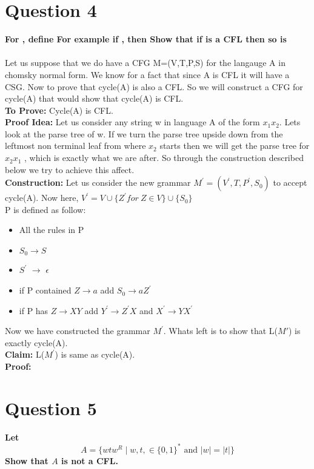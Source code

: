 \documentclass{article}
\begin{document}
\section{Question 4}
\textbf{For , define 
For example if , then 
Show that if  is a CFL then so is } \\
\\
Let us suppose that we do have a CFG M=(V,T,P,S) for the langauge A in chomsky normal form. We know for a fact that since A is CFL it will have a CSG. Now to prove that cycle(A) is also a CFL. So we will construct a CFG for cycle(A) that would show that cycle(A) is CFL. \\
\textbf{To Prove:} Cycle(A) is CFL.\\
\textbf{Proof Idea:} Let us consider any string w in language A of the form $x_1 x_2$. Lets look at the parse tree of w. If we turn the parse tree upside down from the leftmost non terminal leaf from where $x_2$ starts then we will get the parse tree for $x_2 x_1$ , which is exactly what we are after. So through the construction described below we try to achieve this affect.\\
\textbf{Construction:} Let us consider the new grammar $M^{'} = (V^{'},T,P^{'},S_0)$ to accept cycle(A). Now here, $ V^{'} = V \cup \{ Z^{'} for \ Z \in V \} \cup \{ S_0\}$\\ P is defined as follow: 
\begin{itemize}
    \item All the rules in P
    \item $S_0 \rightarrow S$
    \item $S^{'}$ $\rightarrow$ $\epsilon$
    \item if  P  contained $ Z \rightarrow a$ add $S_0 \rightarrow aZ^{'}$
    \item if P has $Z \rightarrow XY$ add $Y^{'} \rightarrow Z^{'}X$  and $X^{'} \rightarrow YX^{'}$
\end{itemize}
Now we have constructed the grammar $M^{'}$. Whats left is to show that L($M{'}$) is exactly cycle(A). \\
\textbf{Claim:} L($M^{'}$) is same as cycle(A). \\
\textbf{Proof:} 

\pagebreak

\section{Question 5}
\textbf{Let $$A = \{wtw^R\mid w,t, \in \{0,1\}^* \text{ \ and \ } |w| = |t|\}$$ Show that $A$ is not a CFL. }\\
\end{document}
